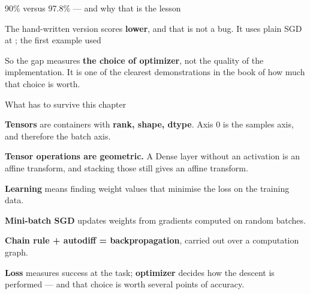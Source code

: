 \documentclass[aspectratio=169,11pt,t]{beamer}
\begin{document}
\begin{frame}[shrink=25]{90\% versus 97.8\% --- and why that is the lesson}
\begin{iband}[amber]
The hand-written version scores \textbf{lower}, and that is not a bug. It uses plain SGD at ; the first example used 
\end{iband}
{\fontsize{9.4}{12.6}\selectfont\color{fg2}So the gap measures \textbf{the choice of optimizer}, not the quality of the implementation. It is one of the clearest demonstrations in the book of how much that choice is worth.\par}\vskip 4pt
\end{frame}

\begin{frame}[shrink=25]{What has to survive this chapter}
\begin{isteps}
\item \textbf{Tensors} are containers with \textbf{rank, shape, dtype}. Axis 0 is the samples axis, and therefore the batch axis.
\item \textbf{Tensor operations are geometric.} A Dense layer without an activation is an affine transform, and stacking those still gives an affine transform.
\item \textbf{Learning} means finding weight values that minimise the loss on the training data.
\item \textbf{Mini-batch SGD} updates weights from gradients computed on random batches.
\item \textbf{Chain rule + autodiff = backpropagation}, carried out over a computation graph.
\item \textbf{Loss} measures success at the task; \textbf{optimizer} decides how the descent is performed --- and that choice is worth several points of accuracy.
\end{isteps}
\vskip 4pt
\vskip 2pt
\end{frame}
\end{document}
